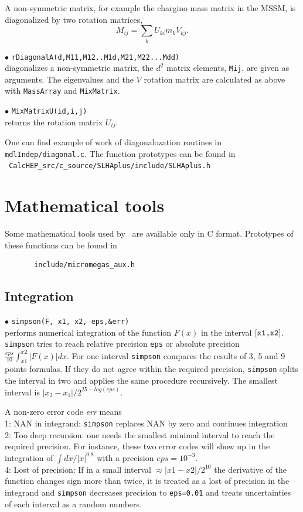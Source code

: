 \documentclass[12pt,a4paper]{article}
\begin{document}
A non-symmetric matrix, for example the 
chargino mass matrix in the  MSSM, is diagonalized by  two rotation matrices,
$$  M_{ij} = \sum\limits_k  U_{ki} m_k V_{kj}.$$ 

\noindent
$\bullet$ \verb|rDiagonalA(d,M11,M12..M1d,M21,M22...Mdd)|\\ 
diagonalizes a non-symmetric matrix, the $d^2$  matrix elements, \verb|Mij|, are given as arguments.
The eigenvalues and the $V$ rotation matrix are calculated as above with 
\verb|MassArray| and \verb|MixMatrix|. 

\noindent
$\bullet$ \verb|MixMatrixU(id,i,j)|\\
returns the rotation matrix $U_{ij}$.

One can find example of work of diagonalozation routines in {\tt mdlIndep/diagonal.c}.
The function prototypes can be found in \\
\noindent
\verb| CalcHEP_src/c_source/SLHAplus/include/SLHAplus.h|

\section{Mathematical tools}

Some mathematical tools used by \micro\ are available only 
in C format. Prototypes of these functions can be found in
\begin{verbatim}
       include/micromegas_aux.h 
\end{verbatim}

\subsection{Integration}
\label{Simpson}
\noindent$\bullet$ \verb|simpson(F, x1, x2, eps,&err)|\\
performs numerical integration of the function $F(x)$ in the interval $[\verb|x1,x2|]$.
{\tt simpson} tries to reach  relative precision \verb|eps| or absolute precision $\frac{eps}{10}
\int_{x1}^{x2}|F(x)|dx$.  
For one  interval {\tt simpson} compares the results of  3, 5 and 9 points formulas.
If they do not agree within the  required precision, {\tt simpson} splits the interval in two 
and applies the same procedure  recursively. The smallest interval is
$|x_2-x_1|/2^{25-log(eps)}$. 

A non-zero error code {\it err} means\\
1: NAN in integrand:  \verb|simpson| replaces NAN by zero and continues integration\\
2: Too deep recursion:  one needs the smallest minimal interval to reach the required precision.   For instance, these two error codes
will show up  in the  integration of   $\int dx/|x|^{0.8}$  with a precision  $eps=10^{-3}$.  \\
4: Lost of precision:   If in a small interval $\approx |x1-x2|/2^{10}$ the derivative of the 
function  changes  sign more than twice, it is treated as a lost of precision in the integrand and  \verb|simpson|
decreases precision to {\tt eps=0.01} and treats uncertainties of each interval as a random
numbers. 
\end{document}
